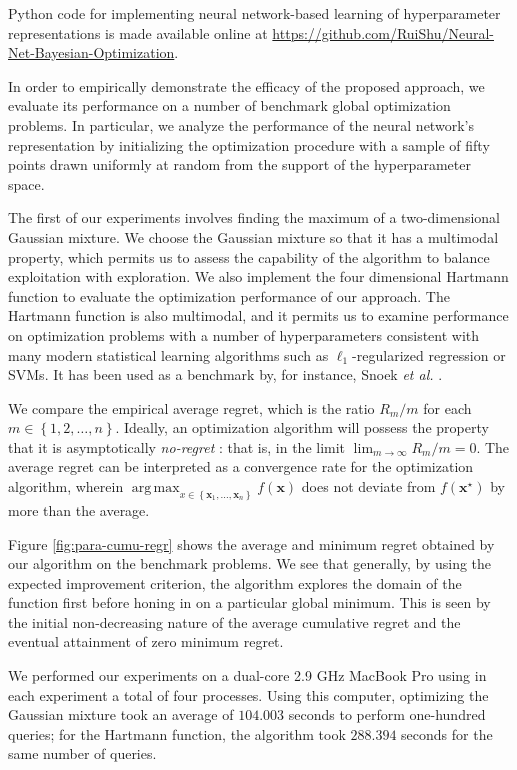 \documentclass[]{article}
\DeclareMathOperator*{\argmax}{arg\,max}
\newcommand{\paren}[1]{\left({#1}\right)}
\newcommand{\set}[1]{\left\{{#1}\right\}}
\newcommand{\1}{\mathbf{1}}
\newcommand{\0}{\mathbf{0}}
\newcommand{\x}{\mathbf{x}}
\begin{document}
Python code for implementing neural network-based learning of hyperparameter representations is made available online at \url{https://github.com/RuiShu/Neural-Net-Bayesian-Optimization}. 

In order to empirically demonstrate the efficacy of the proposed approach, we evaluate its performance on a number of benchmark global optimization problems. In particular, we analyze the performance of the neural network's representation by initializing the optimization procedure with a sample of fifty points drawn uniformly at random from the support of the hyperparameter space.

The first of our experiments involves finding the maximum of a two-dimensional Gaussian mixture. We choose the Gaussian mixture so that it has a multimodal property, which permits us to assess the capability of the algorithm to balance exploitation with exploration. We also implement the four dimensional Hartmann function to evaluate the optimization performance of our approach. The Hartmann function is also multimodal, and it permits us to examine performance on optimization problems with a number of hyperparameters consistent with many modern statistical learning algorithms such as $\ell_1$-regularized regression or SVMs. It has been used as a benchmark by, for instance, Snoek \textit{et al.} \cite{snoek-scalable}.

We compare the empirical average regret, which is the ratio $R_m / m$ for each $m\in\set{ 1,2,\ldots, n}$. Ideally, an optimization algorithm will possess the property that it is asymptotically \textit{no-regret} \cite{srinivas-bandit}: that is, in the limit $\lim_{m\to\infty} R_m / m = 0$. The average regret can be interpreted as a convergence rate for the optimization algorithm, wherein $\argmax_{x\in \set{\x_1,\ldots,\x_n}} f\paren{\x}$ does not deviate from $f\paren{\x^\star}$ by more than the average.

Figure \ref{fig:para-cumu-regr} shows the average and minimum regret obtained by our algorithm on the benchmark problems. We see that generally, by using the expected improvement criterion, the algorithm explores the domain of the function first before honing in on a particular global minimum. This is seen by the initial non-decreasing nature of the average cumulative regret and the eventual attainment of zero minimum regret.

We performed our experiments on a dual-core 2.9 GHz MacBook Pro using in each experiment a total of four processes. Using this computer, optimizing the Gaussian mixture took an average of $104.003$ seconds to perform one-hundred queries; for the Hartmann function, the algorithm took $288.394$ seconds for the same number of queries. 
\end{document}
